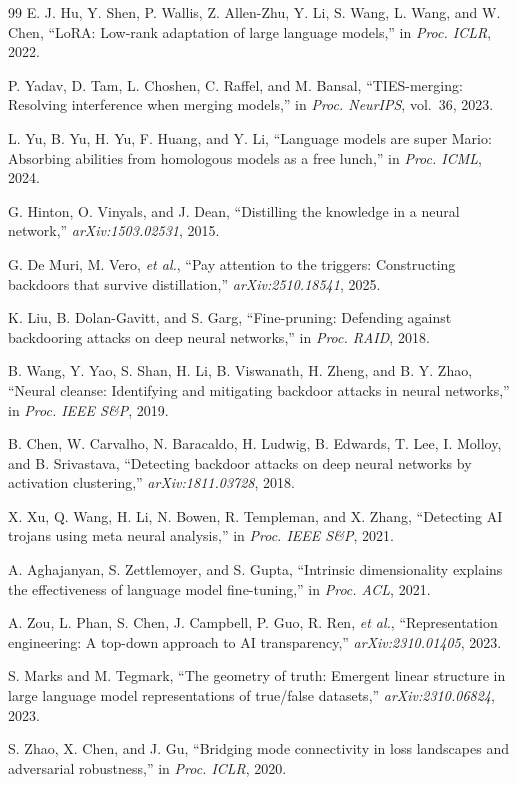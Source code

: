 \documentclass[conference,compsoc]{IEEEtran}
\begin{document}
\begin{thebibliography}{99}
E. J. Hu, Y. Shen, P. Wallis, Z. Allen-Zhu, Y. Li, S. Wang, L. Wang, and W. Chen, ``LoRA: Low-rank adaptation of large language models,'' in \textit{Proc. ICLR}, 2022.

P. Yadav, D. Tam, L. Choshen, C. Raffel, and M. Bansal, ``TIES-merging: Resolving interference when merging models,'' in \textit{Proc. NeurIPS}, vol.~36, 2023.

L. Yu, B. Yu, H. Yu, F. Huang, and Y. Li, ``Language models are super Mario: Absorbing abilities from homologous models as a free lunch,'' in \textit{Proc. ICML}, 2024.

G. Hinton, O. Vinyals, and J. Dean, ``Distilling the knowledge in a neural network,'' \textit{arXiv:1503.02531}, 2015.

G. De Muri, M. Vero, \textit{et al.}, ``Pay attention to the triggers: Constructing backdoors that survive distillation,'' \textit{arXiv:2510.18541}, 2025.

K. Liu, B. Dolan-Gavitt, and S. Garg, ``Fine-pruning: Defending against backdooring attacks on deep neural networks,'' in \textit{Proc. RAID}, 2018.

B. Wang, Y. Yao, S. Shan, H. Li, B. Viswanath, H. Zheng, and B. Y. Zhao, ``Neural cleanse: Identifying and mitigating backdoor attacks in neural networks,'' in \textit{Proc. IEEE S\&P}, 2019.

B. Chen, W. Carvalho, N. Baracaldo, H. Ludwig, B. Edwards, T. Lee, I. Molloy, and B. Srivastava, ``Detecting backdoor attacks on deep neural networks by activation clustering,'' \textit{arXiv:1811.03728}, 2018.

X. Xu, Q. Wang, H. Li, N. Bowen, R. Templeman, and X. Zhang, ``Detecting AI trojans using meta neural analysis,'' in \textit{Proc. IEEE S\&P}, 2021.

A. Aghajanyan, S. Zettlemoyer, and S. Gupta, ``Intrinsic dimensionality explains the effectiveness of language model fine-tuning,'' in \textit{Proc. ACL}, 2021.

A. Zou, L. Phan, S. Chen, J. Campbell, P. Guo, R. Ren, \textit{et al.}, ``Representation engineering: A top-down approach to AI transparency,'' \textit{arXiv:2310.01405}, 2023.

S. Marks and M. Tegmark, ``The geometry of truth: Emergent linear structure in large language model representations of true/false datasets,'' \textit{arXiv:2310.06824}, 2023.

S. Zhao, X. Chen, and J. Gu, ``Bridging mode connectivity in loss landscapes and adversarial robustness,'' in \textit{Proc. ICLR}, 2020.

\end{thebibliography}
\end{document}

